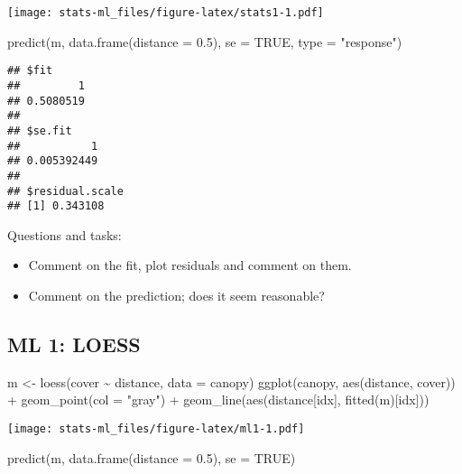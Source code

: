 \documentclass[
]{article}
\newenvironment{Shaded}{\begin{snugshade}}{\end{snugshade}}
\newcommand{\AttributeTok}[1]{\textcolor[rgb]{0.77,0.63,0.00}{#1}}
\newcommand{\ConstantTok}[1]{\textcolor[rgb]{0.00,0.00,0.00}{#1}}
\newcommand{\FloatTok}[1]{\textcolor[rgb]{0.00,0.00,0.81}{#1}}
\newcommand{\FunctionTok}[1]{\textcolor[rgb]{0.00,0.00,0.00}{#1}}
\newcommand{\NormalTok}[1]{#1}
\newcommand{\OtherTok}[1]{\textcolor[rgb]{0.56,0.35,0.01}{#1}}
\newcommand{\SpecialCharTok}[1]{\textcolor[rgb]{0.00,0.00,0.00}{#1}}
\newcommand{\StringTok}[1]{\textcolor[rgb]{0.31,0.60,0.02}{#1}}
\providecommand{\tightlist}{%
  \setlength{\itemsep}{0pt}\setlength{\parskip}{0pt}}
\begin{document}
\texttt{[image: stats-ml\_files/figure-latex/stats1-1.pdf]}

\begin{Shaded}
\begin{Highlighting}[]
\FunctionTok{predict}\NormalTok{(m, }\FunctionTok{data.frame}\NormalTok{(}\AttributeTok{distance =} \FloatTok{0.5}\NormalTok{), }\AttributeTok{se =} \ConstantTok{TRUE}\NormalTok{, }\AttributeTok{type =} \StringTok{"response"}\NormalTok{)}
\end{Highlighting}
\end{Shaded}

\begin{verbatim}
## $fit
##         1 
## 0.5080519 
## 
## $se.fit
##           1 
## 0.005392449 
## 
## $residual.scale
## [1] 0.343108
\end{verbatim}

Questions and tasks:

\begin{itemize}
\tightlist
\item
  Comment on the fit, plot residuals and comment on them.
\item
  Comment on the prediction; does it seem reasonable?
\end{itemize}

\hypertarget{ml-1-loess}{%
\subsection{ML 1: LOESS}\label{ml-1-loess}}

\begin{Shaded}
\begin{Highlighting}[]
\NormalTok{m }\OtherTok{\textless{}{-}} \FunctionTok{loess}\NormalTok{(cover }\SpecialCharTok{\textasciitilde{}}\NormalTok{ distance, }\AttributeTok{data =}\NormalTok{ canopy)}
\FunctionTok{ggplot}\NormalTok{(canopy, }\FunctionTok{aes}\NormalTok{(distance, cover)) }\SpecialCharTok{+} \FunctionTok{geom\_point}\NormalTok{(}\AttributeTok{col =} \StringTok{"gray"}\NormalTok{) }\SpecialCharTok{+}
  \FunctionTok{geom\_line}\NormalTok{(}\FunctionTok{aes}\NormalTok{(distance[idx], }\FunctionTok{fitted}\NormalTok{(m)[idx]))}
\end{Highlighting}
\end{Shaded}

\texttt{[image: stats-ml\_files/figure-latex/ml1-1.pdf]}

\begin{Shaded}
\begin{Highlighting}[]
\FunctionTok{predict}\NormalTok{(m, }\FunctionTok{data.frame}\NormalTok{(}\AttributeTok{distance =} \FloatTok{0.5}\NormalTok{), }\AttributeTok{se =} \ConstantTok{TRUE}\NormalTok{)}
\end{Highlighting}
\end{Shaded}
\end{document}

